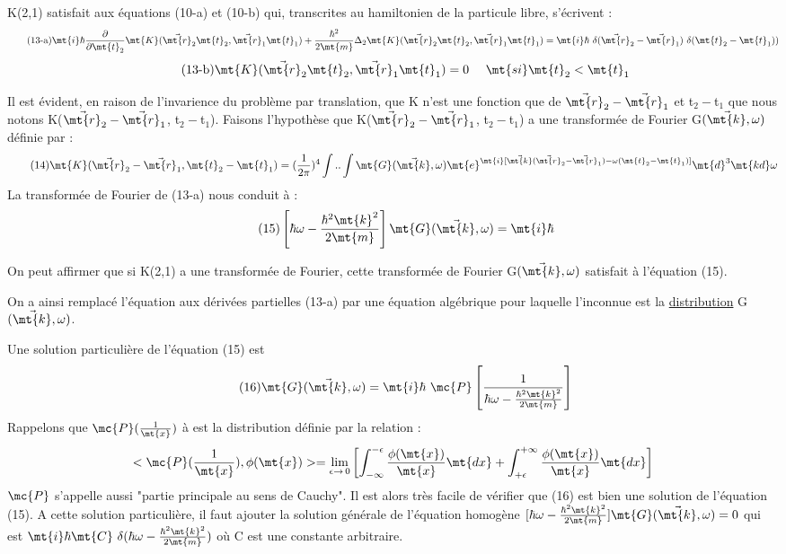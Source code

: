 K(2,1) satisfait aux équations (10-a) et (10-b) qui, transcrites au hamiltonien de la particule libre, s'écrivent :
\[
\tag{13-a}\mt{i}\hbar\frac{\partial}{\partial\mt{t}_2}\mt{K}(\vec{\mt{r}}_2\mt{t}_2,\vec{\mt{r}}_1\mt{t}_1)
+\frac{\hbar^2}{2\mt{m}}\Delta_2\mt{K}(\vec{\mt{r}}_2\mt{t}_2,\vec{\mt{r}}_1\mt{t}_1)
=\mt{i}\hbar\ \delta(\vec{\mt{r}}_2-\vec{\mt{r}}_1)\ \delta(\mt{t}_2-\mt{t}_1))
\]
\[
\tag{13-b}\mt{K}(\vec{\mt{r}}_2\mt{t}_2,\vec{\mt{r}}_1\mt{t}_1)=0\ \ \ \ \mt{si }\mt{t}_2<\mt{t}_1
\]

Il est évident, en raison de l'invarience du problème par
translation, que K n'est une fonction que de $\vec{\mt{r}}_2-\vec{\mt{r}}_1$ et t$_2-$t$_1$ que
nous notons K($\vec{\mt{r}}_2-\vec{\mt{r}}_1$, t$_2-$t$_1$). Faisons l'hypothèse que K($\vec{\mt{r}}_2-\vec{\mt{r}}_1$, t$_2-$t$_1$)
a une transformée de Fourier G$(\vec{\mt{k}},\omega)$ définie par :
\[
\tag{14}\mt{K}(\vec{\mt{r}}_2-\vec{\mt{r}}_1,\mt{t}_2-\mt{t}_1)=(\frac{1}{2\pi})^4
\int..\int\mt{G}(\vec{\mt{k}},\omega)\mt{e}^{\mt{i}[\vec{\mt{k}}(\vec{\mt{r}}_2-\vec{\mt{r}}_1)-\omega(\mt{t}_2-\mt{t}_1)]}\mt{d}^3\mt{k d}\omega
\]
La transformée de Fourier de (13-a) nous conduit à :
\[
\tag{15}\left[\hbar\omega-\frac{\hbar^2\mt{k}^2}{2\mt{m}}\right]\mt{G}(\vec{\mt{k}},\omega)=\mt{i}\hbar
\]

On peut affirmer que si K(2,1) a une transformée de Fourier,
cette transformée de Fourier G$(\vec{\mt{k}},\omega)$ satisfait à l'équation (15).

On a ainsi remplacé l'équation aux dérivées partielles (13-a)
par une équation algébrique pour laquelle l'inconnue est la \ul{distribution}
G$(\vec{\mt{k}},\omega)$.

Une solution particulière de l'équation (15) est
\[
\tag{16}\mt{G}(\vec{\mt{k}},\omega)=\mt{i}\hbar\ \mc{P}\left[\frac{1}{\hbar\omega-\frac{\hbar^2\mt{k}^2}{2\mt{m}}}\right]
\]
Rappelons que $\mc{P}(\frac{1}{\mt{x}})$ à est la distribution définie par la relation :
\[
<\mc{P}(\frac{1}{\mt{x}}),\phi(\mt{x})>=
\lim_{\epsilon\to\,0}\left[\int^{-\epsilon}_{-\infty}\frac{\phi(\mt{x})}{\mt{x}}\mt{dx}+
\int^{+\infty}_{+\epsilon}\frac{\phi(\mt{x})}{\mt{x}}\mt{dx}\right]
\]
$\mc{P}$ s'appelle aussi "partie principale au sens de Cauchy".
Il est alors très facile de vérifier que (16) est bien une solution de
l'équation (15). A cette solution particulière, il faut ajouter la solution
générale de l'équation homogène $[\hbar\omega-\frac{\hbar^2\mt{k}^2}{2\mt{m}}]\mt{G}(\vec{\mt{k}},\omega)=0$
qui est $\mt{i}\hbar\mt{C}\ \delta(\hbar\omega-\frac{\hbar^2\mt{k}^2}{2\mt{m}})$ où C est une constante arbitraire.

